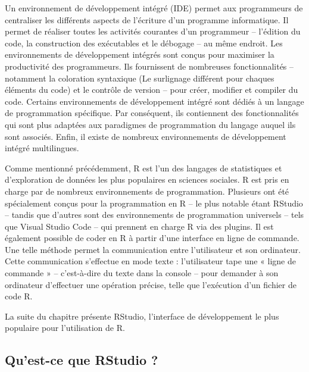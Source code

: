 \documentclass[
  letterpaper,
  DIV=11,
  numbers=noendperiod]{scrreprt}
\begin{document}
Un environnement de développement intégré (IDE) permet aux programmeurs
de centraliser les différents aspects de l'écriture d'un programme
informatique. Il permet de réaliser toutes les activités courantes d'un
programmeur -- l'édition du code, la construction des exécutables et le
débogage -- au même endroit. Les environnements de développement
intégrés sont conçus pour maximiser la productivité des programmeurs.
Ils fournissent de nombreuses fonctionnalités -- notamment la coloration
syntaxique (Le surlignage différent pour chaques éléments du code) et le
contrôle de version -- pour créer, modifier et compiler du code.
Certains environnements de développement intégré sont dédiés à un
langage de programmation spécifique. Par conséquent, ils contiennent des
fonctionnalités qui sont plus adaptées aux paradigmes de programmation
du langage auquel ils sont associés. Enfin, il existe de nombreux
environnements de développement intégré multilingues.

Comme mentionné précédemment, R est l'un des langages de statistiques et
d'exploration de données les plus populaires en sciences sociales. R est
pris en charge par de nombreux environnements de programmation.
Plusieurs ont été spécialement conçus pour la programmation en R -- le
plus notable étant RStudio -- tandis que d'autres sont des
environnements de programmation universels -- tels que Visual Studio
Code -- qui prennent en charge R via des plugins. Il est également
possible de coder en R à partir d'une interface en ligne de commande.
Une telle méthode permet la communication entre l'utilisateur et son
ordinateur. Cette communication s'effectue en mode texte : l'utilisateur
tape une « ligne de commande » -- c'est-à-dire du texte dans la console
-- pour demander à son ordinateur d'effectuer une opération précise,
telle que l'exécution d'un fichier de code R.

La suite du chapitre présente RStudio, l'interface de développement le
plus populaire pour l'utilisation de R.

\subsection{Qu'est-ce que RStudio ?}\label{quest-ce-que-rstudio}
\end{document}
